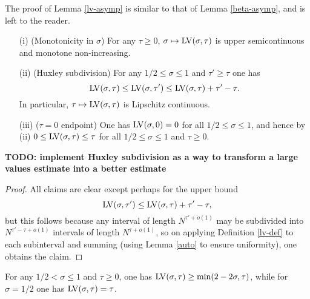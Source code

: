 The proof of Lemma \ref{lv-asymp} is similar to that of Lemma \ref{beta-asymp}, and is left to the reader.


\begin{lemma}\label{lv-basic}
    \begin{itemize}
        \item[(i)] (Monotonicity in $\sigma$) For any $\tau \geq 0$, $\sigma \mapsto \mathrm{LV}(\sigma,\tau)$ is upper semicontinuous and monotone non-increasing.
        \item[(ii)] (Huxley subdivision) For any $1/2 \leq \sigma \leq 1$ and $\tau' \geq \tau$ one has
$$ \mathrm{LV}(\sigma,\tau) \leq \mathrm{LV}(\sigma,\tau') \leq \mathrm{LV}(\sigma,\tau) + \tau'-\tau.$$
In particular, $\tau \mapsto \mathrm{LV}(\sigma,\tau)$ is Lipschitz continuous.
        \item[(iii)]  ($\tau=0$ endpoint) One has $\mathrm{LV}(\sigma,0)=0$ for all $1/2 \leq \sigma \leq 1$, and hence by (ii) $0 \leq \mathrm{LV}(\sigma,\tau) \leq \tau$ for all $1/2 \leq \sigma \leq 1$ and $\tau \geq 0$.
    \end{itemize}
\end{lemma}

{\bf TODO: implement Huxley subdivision as a way to transform a large values estimate into a better estimate}

\begin{proof}
All claims are clear except perhaps for the upper bound
$$ \mathrm{LV}(\sigma,\tau') \leq \mathrm{LV}(\sigma,\tau) + \tau'-\tau,$$
but this follows because any interval of length $N^{\tau'+o(1)}$ may be subdivided into $N^{\tau'-\tau+o(1)}$ intervals of length $N^{\tau+o(1)}$, so on applying Definition \ref{lv-def} to each subinterval and summing (using Lemma \ref{auto} to ensure uniformity), one obtains the claim.
\end{proof}

\begin{lemma}\label{lv-lower}  For any $1/2 < \sigma \leq 1$ and $\tau \geq 0$, one has $\mathrm{LV}(\sigma, \tau) \geq \min(2 - 2 \sigma,\tau)$, while for $\sigma=1/2$ one has $\mathrm{LV}(\sigma,\tau) = \tau$.
\end{lemma}

